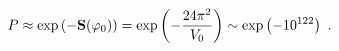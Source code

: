 \begin{equation}\label{thin2}
P\approx \exp\left({-{{\bf S}(\varphi_0) }}\right)=\exp\left(-{24\pi^2\over V_0}\right) \sim \exp\left(-{10^{122}}\right)
\ .
\end{equation}

